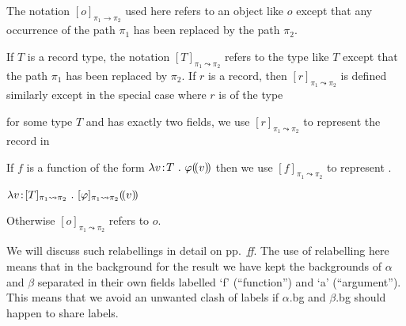 The notation $[o]_{\pi_1\rightarrow\pi_2}$ used here refers to an
object like $o$ except that any occurrence of the path $\pi_1$ has
been replaced by the path $\pi_2$.

\begin{shaded}
If $T$ is a record type, the notation $[T]_{\pi_1\leadsto\pi_2}$ refers to the type
like $T$ except that the path $\pi_1$ has been replaced by $\pi_2$. If
$r$ is a record, then $[r]_{\pi_1\leadsto\pi_2}$ is defined similarly
except in the special case where $r$ is of the type \nexteg{}
\begin{ex} 
\end{ex} 
   for some type $T$ and has
exactly two fields, we use
$[r]_{\pi_1\leadsto\pi_2}$ to represent the record in \nexteg{}
\begin{ex}
\end{ex}
If $f$ is a function of the form $\lambda v\!:\!T\
.\ \varphi(\!(v)\!)$ then we use $[f]_{\pi_1\leadsto\pi_2}$ to
represent \nexteg{}.
\begin{ex}
$\lambda v\!:\![T]_{\pi_1\leadsto\pi_2}\
.\ [\varphi]_{\pi_1\leadsto\pi_2}(\!(v)\!)$
\end{ex}
Otherwise $[o]_{\pi_1\leadsto\pi_2}$ refers to $o$.
\end{shaded}

We will discuss such relabellings in detail on pp.~\pageref{pg:relabelling-intro}\textit{ff}.
The use of relabelling here means that in the background for the result we have kept the
backgrounds of $\alpha$ and $\beta$
separated in their own fields labelled `f' (``function'') and `a'
(``argument''). %
This means that we avoid an unwanted clash of labels
if $\alpha$.bg and $\beta$.bg should happen to share
labels.

